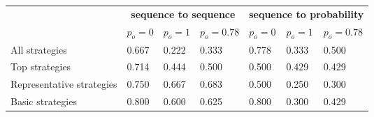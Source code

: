 \begin{tabular}{lllllll}
\toprule
{} & \multicolumn{3}{c}{\textbf{sequence to sequence}} & \multicolumn{3}{c}{\textbf{sequence to probability}} \\
{} &                       $p_o=0$ &                       $p_o=1$ &                    $p_o=0.78$ &                       $p_o=0$ &                       $p_o=1$ &                    $p_o=0.78$ \\
\midrule
All strategies          &  \cellcolor{orange!67.0}0.667 &  \cellcolor{orange!22.0}0.222 &  \cellcolor{orange!33.0}0.333 &  \cellcolor{orange!78.0}0.778 &  \cellcolor{orange!33.0}0.333 &    \cellcolor{orange!50.0}0.500 \\
Top strategies          &  \cellcolor{orange!71.0}0.714 &  \cellcolor{orange!44.0}0.444 &    \cellcolor{orange!50.0}0.500 &    \cellcolor{orange!50.0}0.500 &  \cellcolor{orange!43.0}0.429 &  \cellcolor{orange!43.0}0.429 \\
Representative strategies &   \cellcolor{orange!75.0}0.750 &  \cellcolor{orange!67.0}0.667 &  \cellcolor{orange!68.0}0.683 &    \cellcolor{orange!50.0}0.500 &   \cellcolor{orange!25.0}0.250 &    \cellcolor{orange!30.0}0.300 \\
Basic strategies        &    \cellcolor{orange!80.0}0.800 &    \cellcolor{orange!60.0}0.600 &  \cellcolor{orange!62.0}0.625 &    \cellcolor{orange!80.0}0.800 &    \cellcolor{orange!30.0}0.300 &  \cellcolor{orange!43.0}0.429 \\
\bottomrule
\end{tabular}
